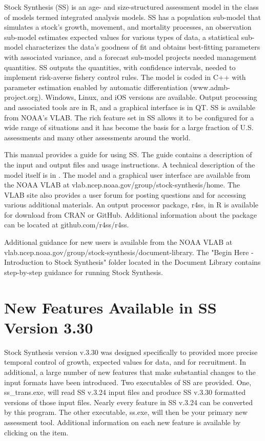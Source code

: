 Stock Synthesis (SS) is an age- and size-structured assessment model in the class of models termed integrated analysis models. SS has a population sub-model that simulates a stock's growth, movement, and mortality processes, an observation sub-model estimates expected values for various types of data, a statistical sub-model characterizes the data’s goodness of fit and obtains best-fitting parameters with associated variance, and a forecast sub-model projects needed management quantities.  SS outputs the quantities, with confidence intervals, needed to implement risk-averse fishery control rules. The model is coded in C++ with parameter estimation enabled by automatic differentiation (www.admb-project.org).  Windows, Linux, and iOS versions are available.  Output processing and associated tools are in R, and a graphical interface is in QT.  SS is available from NOAA’s VLAB. The rich feature set in SS allows it to be configured for a wide range of situations and it has become the basis for a large fraction of U.S. assessments and many other assessments around the world.  

This manual provides a guide for using SS. The guide contains a description of the input and output files and usage instructions. A technical description of the model itself is in \citet{methot_stock_2013}. The model and a graphical user interface are available from the NOAA VLAB at vlab.ncep.noaa.gov/group/stock-synthesis/home. The VLAB site also provides a user forum for posting questions and for accessing various additional materials.  An output processor package, r4ss, in R is available for download from CRAN or GitHub. Additional information about the package can be located at github.com/r4ss/r4ss.

Additional guidance for new users is available from the NOAA VLAB at vlab.ncep.noaa.gov/group/stock-synthesis/document-library.  The "Begin Here - Introduction to Stock Synthesis" folder located in the Document Library contains step-by-step guidance for running Stock Synthesis.  

	
\section{New Features Available in SS Version 3.30}
Stock Synthesis version v.3.30 was designed specifically to provided more precise temporal control of growth, expected values for data, and for recruitment.  In additional, a large number of new features that make substantial changes to the input formats have been introduced.  Two executables of SS are provided.  One, ss\_trans.exe, will read SS v.3.24 input files and produce SS v.3.30 formatted versions of those input files.  Nearly every feature in SS v.3.24 can be converted by this program.  The other executable, ss.exe, will then be your primary new assessment tool. Additional information on each new feature is available by clicking on the item.
		

